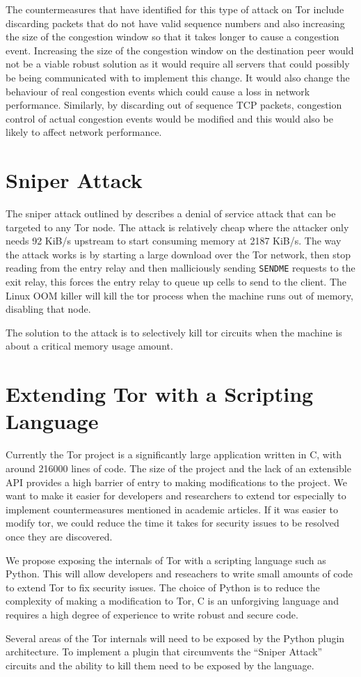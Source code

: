 \documentclass[9pt,technote]{IEEEtran}
\begin{document}
The countermeasures that \citeauthor{gilad2012spying} have identified for this type of attack on Tor include discarding packets that do not have valid sequence numbers and also increasing the size of the congestion window so that it takes longer to cause a congestion event. Increasing the size of the congestion window on the destination peer would not be a viable robust solution as it would require all servers that could possibly be being communicated with to implement this change. It would also change the behaviour of real congestion events which could cause a loss in network performance. Similarly, by discarding out of sequence TCP packets, congestion control of actual congestion events would be modified and this would also be likely to affect network performance.

\section{Sniper Attack}
The sniper attack outlined by \citeauthor{jansen2014sniper} describes a denial
of service attack that can be targeted to any Tor node. The attack is relatively
cheap where the attacker only needs 92 KiB/s upstream to start consuming memory
at 2187 KiB/s. The way the attack works is by starting a large download over the
Tor network, then stop reading from the entry relay and then malliciously
sending \texttt{SENDME} requests to the exit relay, this forces the entry relay
to queue up cells to send to the client. The Linux OOM killer will kill the tor
process when the machine runs out of memory, disabling that node.

The solution to the attack is to selectively kill tor circuits when the machine
is about a critical memory usage amount.

\section{Extending Tor with a Scripting Language}
Currently the Tor project is a significantly large application written in C,
with around 216000 lines of code. The size of the project and the lack of an
extensible API provides a high barrier of entry to making modifications to the
project. We want to make it easier for developers and researchers to extend tor
especially to implement countermeasures mentioned in academic articles. If it
was easier to modify tor, we could reduce the time it takes for security issues
to be resolved once they are discovered.

We propose exposing the internals of Tor with a scripting language such as
Python. This will allow developers and reseachers to write small amounts of code
to extend Tor to fix security issues. The choice of Python is to reduce the
complexity of making a modification to Tor, C is an unforgiving language and
requires a high degree of experience to write robust and secure code.

Several areas of the Tor internals will need to be exposed by the Python plugin
architecture. To implement a plugin that circumvents the ``Sniper Attack''
circuits and the ability to kill them need to be exposed by the language.



\end{document}
